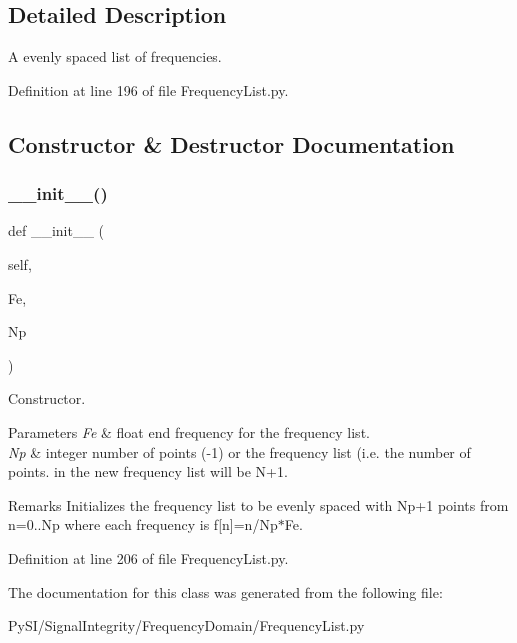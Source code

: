 \subsection{Detailed Description}
A evenly spaced list of frequencies. 

Definition at line 196 of file Frequency\+List.\+py.



\subsection{Constructor \& Destructor Documentation}
\mbox{\label{classSignalIntegrity_1_1FrequencyDomain_1_1FrequencyList_1_1EvenlySpacedFrequencyList_a14670857025f1633a7f1db215d83c385}} 
\subsubsection{\texorpdfstring{\+\_\+\+\_\+init\+\_\+\+\_\+()}{\_\_init\_\_()}}
{\footnotesize\ttfamily def \+\_\+\+\_\+init\+\_\+\+\_\+ (\begin{DoxyParamCaption}\item[{}]{self,  }\item[{}]{Fe,  }\item[{}]{Np }\end{DoxyParamCaption})}



Constructor. 


\begin{DoxyParams}{Parameters}
{\em Fe} & float end frequency for the frequency list. \\
\hline
{\em Np} & integer number of points (-\/1) or the frequency list (i.\+e. the number of points. in the new frequency list will be N+1. \\
\hline
\end{DoxyParams}
\begin{DoxyRemark}{Remarks}
Initializes the frequency list to be evenly spaced with Np+1 points from n=0..Np where each frequency is f\mbox{[}n\mbox{]}=n/\+Np$\ast$\+Fe. 
\end{DoxyRemark}


Definition at line 206 of file Frequency\+List.\+py.



The documentation for this class was generated from the following file\+:\begin{DoxyCompactItemize}
\item 
Py\+S\+I/\+Signal\+Integrity/\+Frequency\+Domain/Frequency\+List.\+py\end{DoxyCompactItemize}
